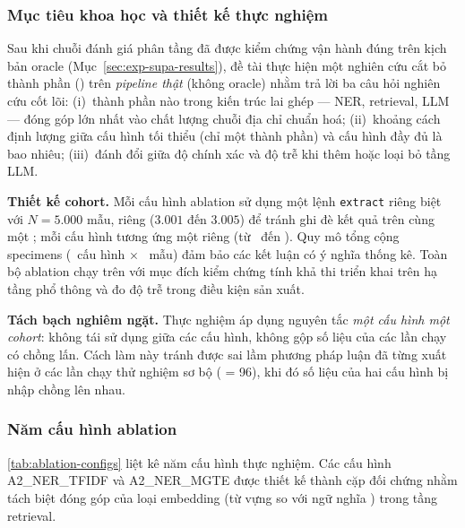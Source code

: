 \subsubsection{Mục tiêu khoa học và thiết kế thực nghiệm}
\label{sec:exp-ablation-design}

Sau khi chuỗi đánh giá phân tầng đã được kiểm chứng vận hành đúng trên kịch bản oracle (Mục~\ref{sec:exp-supa-results}), đề tài thực hiện một nghiên cứu cắt bỏ thành phần () trên \emph{pipeline thật} (không oracle) nhằm trả lời ba câu hỏi nghiên cứu cốt lõi: (i)~thành phần nào trong kiến trúc lai ghép --- NER, retrieval, LLM --- đóng góp lớn nhất vào chất lượng chuỗi địa chỉ chuẩn hoá; (ii)~khoảng cách định lượng giữa cấu hình tối thiểu (chỉ một thành phần) và cấu hình đầy đủ là bao nhiêu; (iii)~đánh đổi giữa độ chính xác và độ trễ khi thêm hoặc loại bỏ tầng LLM.

\textbf{Thiết kế cohort.} Mỗi cấu hình ablation sử dụng một lệnh \texttt{extract} riêng biệt với \(N = 5.000\) mẫu,  riêng (\(3.001\) đến \(3.005\)) để tránh ghi đè kết quả trên cùng một ; mỗi cấu hình tương ứng một  riêng (từ \VNAIABLATIONAOneRunId\, đến \VNAIABLATIONAFourRunId). Quy mô tổng cộng \VNAIABLATIONTotalSpecimens\, specimens (\VNAIABLATIONNumConfigs\, cấu hình \(\times\) \VNAIABLATIONNPerConfig\, mẫu) đảm bảo các kết luận có ý nghĩa thống kê. Toàn bộ ablation chạy trên \textbf{\VNAIABLATIONPlatform} với mục đích kiểm chứng tính khả thi triển khai trên hạ tầng phổ thông và đo độ trễ trong điều kiện sản xuất.

\textbf{Tách bạch nghiêm ngặt.} Thực nghiệm áp dụng nguyên tắc \emph{một cấu hình một cohort}: không tái sử dụng  giữa các cấu hình, không gộp số liệu của các lần chạy có  chồng lấn. Cách làm này tránh được sai lầm phương pháp luận đã từng xuất hiện ở các lần chạy thử nghiệm sơ bộ ( = 96), khi đó số liệu của hai cấu hình bị nhập chồng lên nhau.

\subsubsection{Năm cấu hình ablation}
\label{sec:exp-ablation-configs}

\cref{tab:ablation-configs} liệt kê năm cấu hình thực nghiệm. Các cấu hình A2\_NER\_TFIDF và A2\_NER\_MGTE được thiết kế thành cặp đối chứng nhằm tách biệt đóng góp của loại embedding (từ vựng  so với ngữ nghĩa ) trong tầng retrieval.

